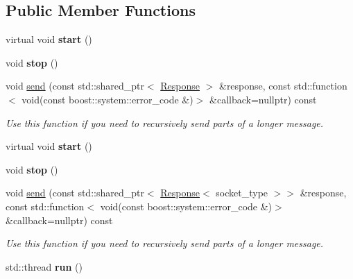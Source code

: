 \subsection*{Public Member Functions}
\begin{DoxyCompactItemize}
\item 
\mbox{\label{classhttp_1_1_server_base_a9f6aa2e83c81771e961db18f7d9ddd73}} 
virtual void {\bfseries start} ()
\item 
\mbox{\label{classhttp_1_1_server_base_a72dafc55c0920e3dd793fc04cf99e599}} 
void {\bfseries stop} ()
\item 
\mbox{\label{classhttp_1_1_server_base_a32abca1505e7b45637c2a37d9c4289b1}} 
void \hyperlink{classhttp_1_1_server_base_a32abca1505e7b45637c2a37d9c4289b1}{send} (const std\+::shared\+\_\+ptr$<$ \hyperlink{classhttp_1_1_server_base_1_1_response}{Response} $>$ \&response, const std\+::function$<$ void(const boost\+::system\+::error\+\_\+code \&)$>$ \&callback=nullptr) const
\begin{DoxyCompactList}\small\item\em Use this function if you need to recursively send parts of a longer message. \end{DoxyCompactList}\item 
\mbox{\label{classhttp_1_1_server_base_a9f6aa2e83c81771e961db18f7d9ddd73}} 
virtual void {\bfseries start} ()
\item 
\mbox{\label{classhttp_1_1_server_base_a72dafc55c0920e3dd793fc04cf99e599}} 
void {\bfseries stop} ()
\item 
\mbox{\label{classhttp_1_1_server_base_a6abea557f4b23197982804fb9b3e0141}} 
void \hyperlink{classhttp_1_1_server_base_a6abea557f4b23197982804fb9b3e0141}{send} (const std\+::shared\+\_\+ptr$<$ \hyperlink{classhttp_1_1_server_base_1_1_response}{Response}$<$ socket\+\_\+type $>$$>$ \&response, const std\+::function$<$ void(const boost\+::system\+::error\+\_\+code \&)$>$ \&callback=nullptr) const
\begin{DoxyCompactList}\small\item\em Use this function if you need to recursively send parts of a longer message. \end{DoxyCompactList}\item 
\mbox{\label{classhttp_1_1_server_base_a23e58069408006f0825fd8177bcf43c2}} 
std\+::thread {\bfseries run} ()
\end{DoxyCompactItemize}
